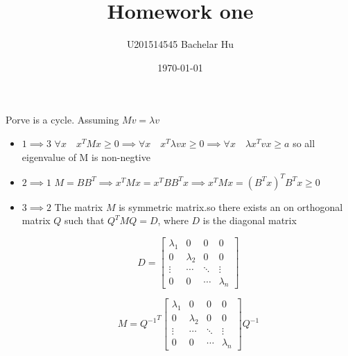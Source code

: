 \documentclass{article}
\title{Homework one}
\author{U201514545 Bachelar Hu}
\date{\today}
\begin{document}
\maketitle
\section{}
Porve is a cycle.\newline
Assuming $Mv = {\lambda}v$

\begin{itemize}
    \item
        $1 \implies 3$\newline
        $\forall{x} \quad x^{T}Mx\geq0  \implies\forall{x} \quad x^{T}{\lambda}vx \geq 0
        \implies\forall{x} \quad {\lambda}x^{T}vx \geq a$\newline
        so all eigenvalue of M is non-negtive
    \item
        $2 \implies 1$\newline
        $M=BB^{T}\implies x^{T}Mx=x^{T}BB^{T}x \implies x^{T}Mx=(B^{T}x)^{T}B^{T}x\geq0$
    \item
        $3 \implies 2$\newline
        The matrix $M$ is symmetric matrix.so there exists an on
        orthogonal matrix $Q$ such that $Q^{T}MQ=D$, where $D$ is the
        diagonal matrix

        \[D=\begin{bmatrix}
            \lambda_1 & 0 & 0 & 0 \\
            0 & \lambda_2 & 0 & 0 \\
            \vdots & \cdots & \ddots & \vdots \\
            0 & 0 & \cdots & \lambda_n
        \end{bmatrix}\]

        \[
            M = {Q^{-1}}^{T}
            \begin{bmatrix}
            \lambda_1 & 0 & 0 & 0 \\
            0 & \lambda_2 & 0 & 0 \\
            \vdots & \cdots & \ddots & \vdots \\
            0 & 0 & \cdots & \lambda_n
            \end{bmatrix}
            Q^{-1}
        \]


\end{itemize}
\end{document}
